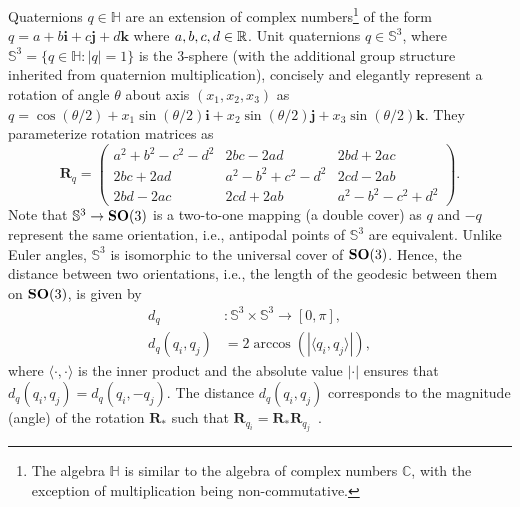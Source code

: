 Quaternions $q \in \mathbb{H}$ are an extension of complex numbers\footnote{The algebra $\mathbb{H}$ is similar to the algebra of complex numbers $\mathbb{C}$, with the exception of multiplication being non-commutative.} of the form $q = a + b\boldsymbol{i} + c\boldsymbol{j} + d\boldsymbol{k}$ where $a,b,c,d \in \mathbb{R}$.
Unit quaternions $q \in \mathbb{S}^3$, where $\mathbb{S}^3 = \big\{ q \in \mathbb{H}: \lvert q \rvert = 1 \big\}$ is the 3-sphere (with the additional group structure inherited from quaternion multiplication), concisely and elegantly represent a rotation of angle $\theta$ about axis $(x_1, x_2, x_3)$ as $q = \cos(\theta/2) + x_1 \sin(\theta/2) \boldsymbol{i} + x_2 \sin(\theta/2) \boldsymbol{j} + x_3 \sin(\theta/2) \boldsymbol{k}$.
They parameterize rotation matrices as
\begin{equation*}
    \mathbf{R}_q =
    \begin{pmatrix}
        a^2+b^2-c^2-d^2 & 2bc-2ad & 2bd+2ac \\
        2bc+2ad & a^2-b^2+c^2-d^2 & 2cd-2ab \\
        2bd-2ac & 2cd+2ab & a^2-b^2-c^2+d^2
    \end{pmatrix}.
\end{equation*}
Note that $\mathbb{S}^3 \rightarrow \mathrm{\mathbf{SO}}(3)$ is a two-to-one mapping (a double cover) as $q$ and $-q$ represent the same orientation, i.e., antipodal points of $\mathbb{S}^3$ are equivalent.
Unlike Euler angles, $\mathbb{S}^3$ is isomorphic to the universal cover of $\mathrm{\mathbf{SO}}(3)$.
Hence, the distance between two orientations, i.e., the length of the geodesic between them on $\mathrm{\mathbf{SO}}(3)$, is given by
\begin{equation}
    \begin{aligned}
        d_q &: \mathbb{S}^3 \times \mathbb{S}^3 \rightarrow [0,\pi], \\
        d_q(q_i, q_j) &= 2 \arccos \left( \left| \langle q_i, q_j \rangle \right| \right),
    \label{eqn:distance:orientations}
    \end{aligned}
\end{equation}
where $\langle \cdot, \cdot \rangle$ is the inner product and the absolute value $\left| \cdot \right|$ ensures that $d_q(q_i, q_j) = d_q(q_i, -q_j)$.
The distance $d_q(q_i, q_j)$ corresponds to the magnitude (angle) of the rotation $\mathbf{R}_*$ such that $\mathbf{R}_{q_i} = \mathbf{R}_* \mathbf{R}_{q_j}$~\cite{huynh2009metrics}.

